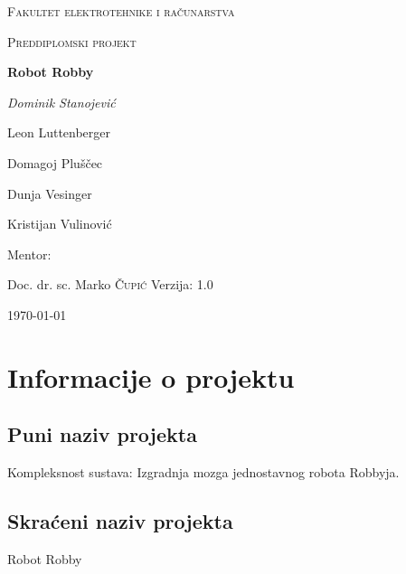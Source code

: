 \documentclass[times, utf8, numeric]{fer}
\begin{document}
\begin{titlepage}
	\centering
	{\scshape\LARGE Fakultet elektrotehnike i računarstva \par}
	\vspace{1cm}
	{\scshape\Large Preddiplomski projekt\par}
	\vspace{1.5cm}
	{\huge\bfseries Robot Robby\par}
	\vspace{2cm}
	{\Large\itshape
	Dominik Stanojević \par
	Leon Luttenberger \par
	Domagoj Pluščec \par
	Dunja Vesinger \par
	Kristijan Vulinović\par}
	\vfill
	Mentor:\par
	Doc. dr. sc. Marko \textsc{Čupić}
	\vfill	
	Verzija: 1.0
	\vfill

	{\large \today\par}
\end{titlepage}

\pagebreak
\tableofcontents

\pagebreak
{}

\chapter{Informacije o projektu}
\section{Puni naziv projekta}
Kompleksnost sustava: Izgradnja mozga jednostavnog robota Robbyja.

\section{Skraćeni naziv projekta}
Robot Robby
\end{document}
